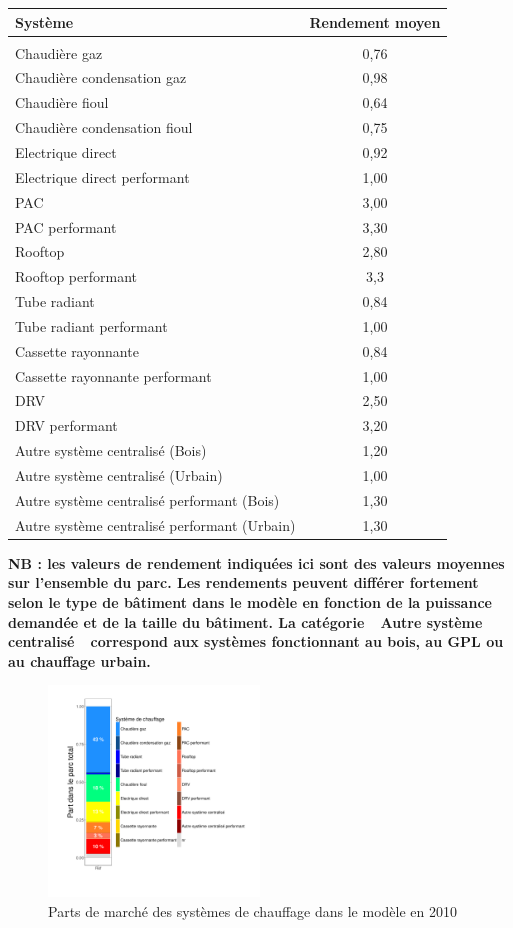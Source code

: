 \documentclass[10.5pt,a4paper]{article}
\begin{document}
{\begin{table}[ht]
\begin{center}
\begin{tabular}{l|c}
\textbf{Système}	&	\textbf{Rendement moyen}
\\	\hline	\\	
Chaudière gaz	& 0,76 \\	
Chaudière condensation gaz	& 0,98 \\	
Chaudière fioul & 0,64 \\	
Chaudière condensation fioul	& 0,75 \\	
Electrique direct	& 0,92 \\	
Electrique direct performant	& 1,00 \\	
PAC	& 3,00 \\	
PAC performant	& 3,30 \\	
Rooftop	& 2,80 \\	
Rooftop performant	& 3,3 \\	
Tube radiant	& 0,84 \\	
Tube radiant performant	& 1,00 \\	
Cassette rayonnante	& 0,84 \\	
Cassette rayonnante performant	& 1,00 \\	
DRV	& 2,50 \\	
DRV performant	& 3,20 \\	
Autre système centralisé (Bois)	& 1,20 \\	
Autre système centralisé (Urbain) & 1,00 \\	
Autre système centralisé performant	(Bois) & 1,30 \\	
Autre système centralisé performant	(Urbain)& 1,30 \\	
\hline	
\end{tabular}
\end{center}

\textbf{\footnotesize{NB : les valeurs de rendement indiquées ici sont des valeurs moyennes sur l'ensemble du parc. Les rendements peuvent différer fortement selon le type de bâtiment dans le modèle en fonction de la puissance demandée et de la taille du bâtiment. La catégorie~\og~Autre système centralisé~\fg~correspond aux systèmes fonctionnant au bois, au GPL ou au chauffage urbain. }}
\end{table}

\begin{figure}[ht]
\centering
\caption{Parts de marché des systèmes de chauffage dans le modèle en 2010}\label{PMsyst2010}
\includegraphics[width = 0.5\textwidth]{PMsyst2010} 
\end{figure}

}
\end{document}
